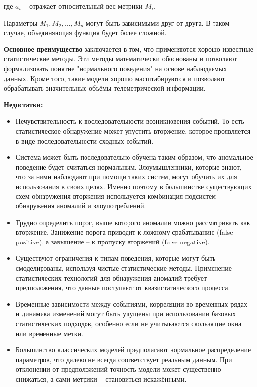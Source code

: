 где $a_i$ -- отражает относительный вес метрики $M_i$.

Параметры $M_1, M_2, \dots, M_n$ могут быть зависимыми друг от друга. В таком случае,
объединяющая функция будет более сложной.\autocite{IDSystem}

\textbf{Основное преимущество} заключается в том, что применяются хорошо известные статистические методы.
Эти методы математически обоснованы и позволяют формализовать понятие "нормального поведения" на основе наблюдаемых данных. Кроме того, такие модели хорошо масштабируются и позволяют обрабатывать значительные объёмы телеметрической информации.

\textbf{Недостатки:}
\begin{itemize}
	\item Нечувствительность к последовательности возникновения событий.
	То есть статистическое обнаружение может упустить вторжение,
	которое проявляется в виде последовательности сходных событий.
	
	\item Система может быть последовательно обучена таким образом, что аномальное поведение
	будет считаться нормальным. Злоумышленники, которые знают, что за ними наблюдают
	при помощи таких систем, могут обучить их для использования в своих целях. Именно поэтому в
	большинстве существующих схем обнаружения вторжения используется комбинация подсистем
	обнаружения аномалий и злоупотреблений.

	\item Трудно определить порог, выше которого аномалии можно рассматривать как вторжение.
	Занижение порога приводит к ложному срабатыванию (false positive), а завышение -- к пропуску вторжений (false negative).

	\item Существуют ограничения к типам поведения, которые могут быть смоделированы,
	используя чистые статистические методы. Применение статистических технологий для
	обнаружения аномалий требует предположения, что данные поступают от квазистатического процесса.

	\item Временные зависимости между событиями, корреляции во временных рядах и динамика изменений
	могут быть упущены при использовании базовых статистических подходов, особенно если не учитываются скользящие окна или временные метки.

	\item Большинство классических моделей предполагают нормальное распределение параметров,
	что далеко не всегда соответствует реальным данным. При отклонении от предположений
	точность модели может существенно снижаться, а сами метрики -- становиться искажёнными.
\end{itemize}
\autocite{IntrusionDetection}


